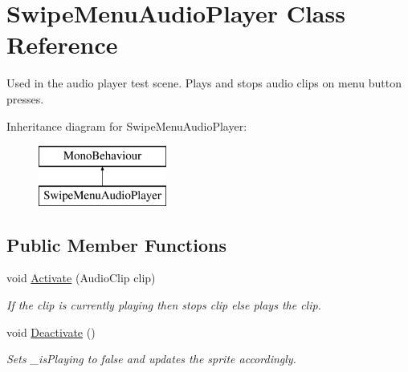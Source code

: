 \hypertarget{class_swipe_menu_audio_player}{}\section{Swipe\+Menu\+Audio\+Player Class Reference}
\label{class_swipe_menu_audio_player}


Used in the audio player test scene. Plays and stops audio clips on menu button presses.  


Inheritance diagram for Swipe\+Menu\+Audio\+Player\+:\begin{figure}[H]
\begin{center}
\leavevmode
\includegraphics[height=2.000000cm]{class_swipe_menu_audio_player}
\end{center}
\end{figure}
\subsection*{Public Member Functions}
\begin{DoxyCompactItemize}
\item 
void \hyperlink{class_swipe_menu_audio_player_a40c1d1fe43404a9f7cdda12cdde1eaad}{Activate} (Audio\+Clip clip)
\begin{DoxyCompactList}\small\item\em If the clip is currently playing then stops clip else plays the clip. \end{DoxyCompactList}\item 
void \hyperlink{class_swipe_menu_audio_player_a7b2308f80cf1210bf5b3ccd3157e060b}{Deactivate} ()
\begin{DoxyCompactList}\small\item\em Sets \+\_\+is\+Playing to false and updates the sprite accordingly. \end{DoxyCompactList}\end{DoxyCompactItemize}

